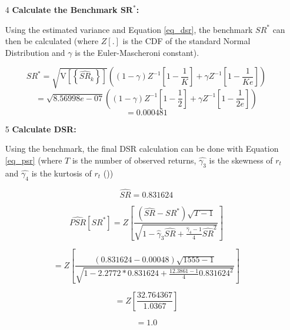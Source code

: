 \documentclass[a4paper,11pt,oneside]{article}
\theoremstyle{plain}
\theoremstyle{definition}
\begin{document}
\begin{itemize}
		\item [4] \textbf{Calculate the Benchmark $\mathbf{SR^*}$:} \newline
		
		Using the estimated variance and Equation \ref{eq_dsr}, the benchmark $SR^*$ can then be calculated (where $Z[.]$ is the CDF of the standard Normal Distribution 
		and $\gamma$ is the Euler-Mascheroni constant).
		
		\begin{equation}
		S R^{*}=\sqrt{\mathrm{V}\left[\left\{\widehat{S R}_{k}\right\}\right]}\left((1-\gamma) Z^{-1}\left[1-\frac{1}{K}\right]+\gamma Z^{-1}\left[1-\frac{1}{K e}\right]\right)
		\end{equation}
		\begin{equation}
		=\sqrt{{8.56998e-07}}\left((1-\gamma) Z^{-1}\left[1-\frac{1}{2}\right]+\gamma Z^{-1}\left[1-\frac{1}{2 e}\right]\right)
		\end{equation}
		\begin{equation}
		=0.000481
		\end{equation}
		
		\item [5] \textbf{Calculate DSR:} \newline
		
		Using the benchmark, the final DSR calculation can be done with Equation \ref{eq_psr} (where $T$ is the number of observed returns, $\hat{\gamma_3}$ is the skewness of $r_t$ and $\hat{\gamma_4}$ is the kurtosis of $r_t$	())
		
		\begin{equation}
		\widehat{SR}=0.831624
		\end{equation}
		
		\begin{equation}
		\widehat{P S R}\left[S R^{*}\right]=Z\left[\frac{\left(\widehat{S R}-S R^{*}\right) \sqrt{T-1}}{\sqrt{1-\hat{\gamma}_{3} \widehat{S R}+\frac{\hat{\gamma}_{4}-1}{4} \widehat{S R}^{2}}}\right]
		\end{equation}
		
		\begin{equation}
		=Z\left[\frac{\left({0.831624}-{0.00048}\right) \sqrt{1555-1}}{\sqrt{1-{2.2772}\ast{0.831624}+\frac{{12.3861}-1}{4}{0.831624}^{2}}}\right]
		\end{equation}
		
		\begin{equation}
		=Z\left[\frac{32.764367}{1.0367}\right]
		\end{equation}
		
		\begin{equation}
		= {1.0}
		\end{equation}
		
		
	\end{itemize}
	
\end{document}
